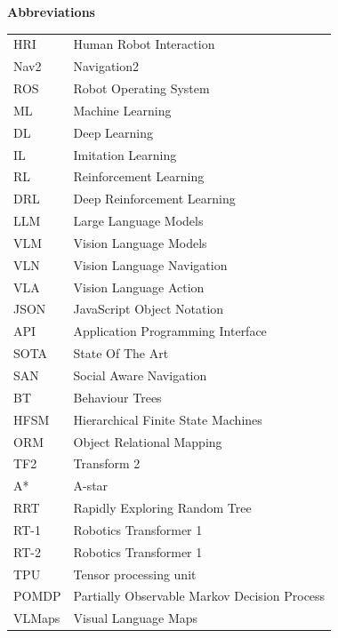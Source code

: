 %
%
\thispagestyle{plain}
{\noindent \huge \bf Abbreviations}\\[20mm]
\begin{tabular}{ll}
	HRI  & Human Robot Interaction  \\
    Nav2 & Navigation2              \\
    ROS  & Robot Operating System   \\ 
    ML   & Machine Learning         \\
    DL   & Deep Learning            \\
    IL   & Imitation Learning       \\
    RL   & Reinforcement Learning   \\
    DRL  & Deep Reinforcement Learning          \\
    LLM  & Large Language Models    \\
    VLM  & Vision Language Models   \\
    VLN  & Vision Language Navigation           \\
    VLA  & Vision Language Action   \\
    JSON & JavaScript Object Notation           \\
    API  & Application Programming Interface    \\
    SOTA & State Of The Art         \\
    SAN  & Social Aware Navigation  \\
    BT   & Behaviour Trees          \\
    HFSM & Hierarchical Finite State Machines   \\
    ORM  & Object Relational Mapping            \\
    TF2  & Transform 2              \\
    A*   & A-star                   \\
    RRT  & Rapidly Exploring Random Tree        \\
    RT-1 & Robotics Transformer 1   \\
    RT-2 & Robotics Transformer 1   \\
    TPU  & Tensor processing unit   \\
    POMDP & Partially Observable Markov Decision Process \\
    VLMaps & Visual Language Maps   \\
\end{tabular}

\cleardoublepage